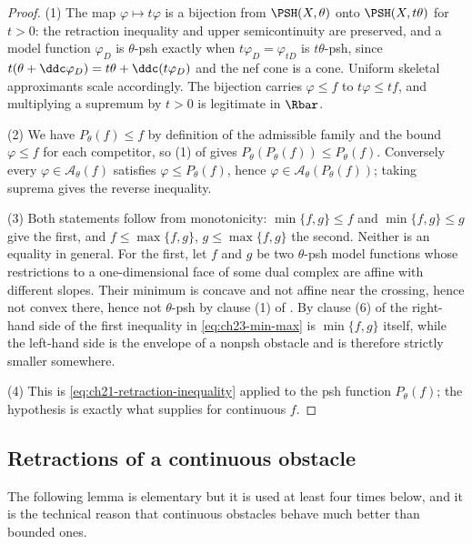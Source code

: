\begin{proof}
(1)  The map \(\varphi\mapsto t\varphi\) is a bijection from
\(\PSH(X,\theta)\) onto \(\PSH(X,t\theta)\) for \(t>0\): the retraction
inequality and upper semicontinuity are preserved, and a model function
\(\varphi_D\) is \(\theta\)-psh exactly when \(t\varphi_D=\varphi_{tD}\) is
\(t\theta\)-psh, since \(t(\theta+\ddc\varphi_D)=t\theta+\ddc(t\varphi_D)\)
and the nef cone is a cone.  Uniform skeletal approximants scale
accordingly.  The bijection carries \(\varphi\leq f\) to \(t\varphi\leq tf\),
and multiplying a supremum by \(t>0\) is legitimate in \(\Rbar\).

(2)  We have \(P_\theta(f)\leq f\) by definition of the admissible family
and the bound \(\varphi\le f\) for each competitor, so (1) of
 gives
\(P_\theta(P_\theta(f))\leq P_\theta(f)\).  Conversely every
\(\varphi\in\mathcal A_\theta(f)\) satisfies \(\varphi\leq P_\theta(f)\),
hence \(\varphi\in\mathcal A_\theta(P_\theta(f))\); taking suprema gives the
reverse inequality.

(3)  Both statements follow from monotonicity: \(\min\{f,g\}\leq f\) and
\(\min\{f,g\}\leq g\) give the first, and \(f\leq\max\{f,g\}\),
\(g\leq\max\{f,g\}\) the second.  Neither is an equality in general.  For
the first, let \(f\) and \(g\) be two \(\theta\)-psh model functions whose
restrictions to a one-dimensional face of some dual complex are affine with
different slopes.  Their minimum is concave and not affine near the
crossing, hence not convex there, hence not \(\theta\)-psh by clause (1) of
.  By clause (6) of
 the right-hand side of the first
inequality in \eqref{eq:ch23-min-max} is \(\min\{f,g\}\) itself, while the
left-hand side is the envelope of a nonpsh obstacle and is therefore
strictly smaller somewhere.

(4)  This is \eqref{eq:ch21-retraction-inequality} applied to the psh
function \(P_\theta(f)\); the hypothesis is exactly what
 supplies for continuous \(f\).
\end{proof}

\subsection{Retractions of a continuous obstacle}
\label{sec:ch23-retraction-uniform}

The following lemma is elementary but it is used at least four times below,
and it is the technical reason that continuous obstacles behave much better
than bounded ones.

